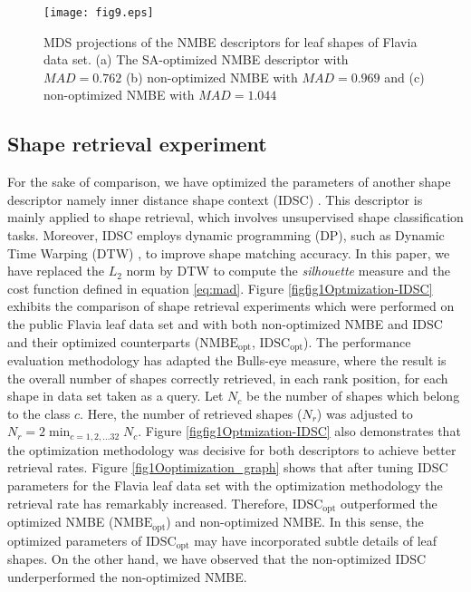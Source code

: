 \begin{figure}[h!]
\centering
\texttt{[image: fig9.eps]}
 \caption{\label{MDS:Leaves} MDS projections of the NMBE descriptors for leaf shapes of Flavia data set. (a) The SA-optimized NMBE descriptor with $MAD = 0.762$ (b) non-optimized NMBE with $MAD =0.969$ and (c) non-optimized NMBE with $MAD = 1.044$ }
\end{figure}

\subsection{Shape retrieval experiment}
For the sake of comparison, we have optimized the parameters of another shape descriptor namely inner distance shape context (IDSC) .
This descriptor is mainly applied to shape retrieval, which involves unsupervised shape classification tasks.  Moreover, IDSC employs dynamic programming (DP), such as Dynamic Time Warping (DTW) , to improve shape matching accuracy. In this paper, we have replaced the $L_2$ norm by DTW to compute the \emph{silhouette} measure and the cost function defined in equation \ref{eq:mad}.  
Figure \ref{figfig1Optmization-IDSC} exhibits the comparison of shape retrieval experiments which were performed on the public Flavia leaf data set and with both non-optimized NMBE and IDSC and their optimized counterparts ($\operatorname{NMBE_{opt}}$, $\operatorname{IDSC_{opt}}$).
The performance evaluation methodology has adapted the Bulls-eye measure, where the result is the overall number of shapes correctly  retrieved, in each rank position, for each shape in data set taken as a query.  Let $N_c$ be the number of shapes which belong to the class $c$. Here, the number of retrieved shapes ($N_r$) was adjusted to $N_r = 2\displaystyle \min_{c = 1,2,\dots 32}{N_c}$. Figure \ref{figfig1Optmization-IDSC} also demonstrates that the optimization methodology was decisive for both descriptors to achieve better retrieval rates. 
Figure \ref{fig1Ooptimization_graph}  shows that after tuning IDSC parameters for the Flavia leaf data set with the optimization methodology the retrieval rate has remarkably increased. Therefore, $\operatorname{IDSC_{opt}}$  outperformed the optimized NMBE ($\operatorname{NMBE_{opt}}$) and non-optimized NMBE. In this sense, the optimized parameters of $\operatorname{IDSC_{opt}}$ may have incorporated subtle details of leaf shapes. On the other hand, we have observed that the non-optimized IDSC underperformed the non-optimized NMBE. 
